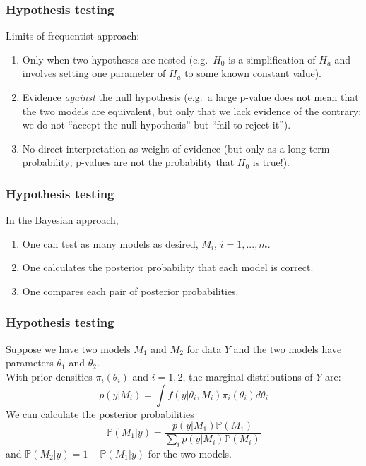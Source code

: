 \documentclass{beamer}
\renewcommand{\P}{\mathbb{P}}
\newcommand{\1}{\ensuremath{\mathbf{1}}}
\begin{document}
%
%
%
\begin{frame}\frametitle{Hypothesis testing}
	Limits of frequentist approach:
	\begin{enumerate}
		\item Only when two hypotheses are nested (e.g.\ $H_0$ is a simplification of $H_a$ and involves setting one parameter of $H_a$ to some known constant value).
		\item Evidence \emph{against} the null hypothesis (e.g.\ a large p-value does not mean that the two models are equivalent, but only that we lack evidence of the contrary; we do not ``accept the null hypothesis'' but ``fail to reject it'').
		\item No direct interpretation as weight of evidence (but only as a long-term probability; p-values are not the probability that $H_0$ is true!).
	\end{enumerate}
\end{frame}
%
%
%
\begin{frame}\frametitle{Hypothesis testing}
	In the Bayesian approach,
	\begin{enumerate}
		\item One can test as many models as desired, $M_i$, $i = 1, ..., m$.
		\item One calculates the posterior probability that each model is correct.
		\item One compares each pair of posterior probabilities.
	\end{enumerate}
\end{frame}
%
%
%
\begin{frame}\frametitle{Hypothesis testing}
	Suppose we have two models $M_1$ and $M_2$ for data $Y$ and the two models have parameters $\theta_1$ and $\theta_2$.\\[1ex]
	With prior densities $\pi_i (\theta_i )$ and $i = 1, 2$, the marginal distributions of $Y$ are:
	\begin{equation}
		p(y|M_i) = \int f(y|\theta_i,M_i) \pi_i (\theta_i ) d\theta_i
	\end{equation}
	We can calculate the posterior probabilities
	\begin{equation}
	 	\P(M_1|y) = \frac{p(y|M_1) \P(M_1)}{\sum_{i}p(y|M_i) \P(M_i)}
	\end{equation}
	and $\P(M_2|y) = 1 - \P(M_1|y)$ for the two models.
\end{frame}
\end{document}
